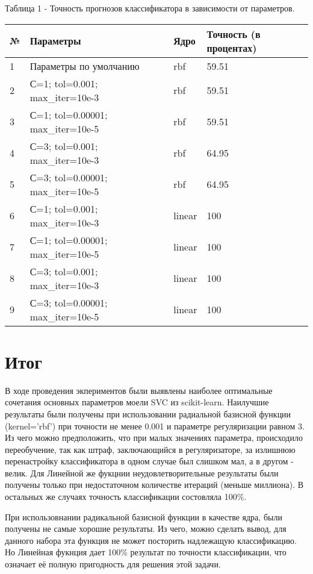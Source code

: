 \documentclass[a4paper,12pt]{article}
\begin{document}
	\vspace{0.5cm}
	Таблица 1 - Точность прогнозов классификатора в зависимости от параметров.
\begin{longtable}{|p{1cm}|p{8cm}|p{2cm}|p{2cm}|}
\hline 
№ & Параметры                         & Ядро    & Точность (в процентах) \\ 
\hline 
1 & Параметры по умолчанию            & rbf     & 59.51 \\
\hline
2 & С=1; tol=0.001; max\_iter=10e-3   & rbf     & 59.51 \\
\hline 
3 & С=1; tol=0.00001; max\_iter=10e-5 & rbf     & 59.51 \\
\hline 
4 &  С=3; tol=0.001; max\_iter=10e-3  & rbf     & 64.95 \\
\hline 
5 & С=3; tol=0.00001; max\_iter=10e-5 & rbf     & 64.95 \\
\hline
6 & С=1; tol=0.001; max\_iter=10e-3   & linear  & 100 \\
\hline 
7 & С=1; tol=0.00001; max\_iter=10e-5 & linear  & 100 \\
\hline 
8 &  С=3; tol=0.001; max\_iter=10e-3  & linear  & 100 \\
\hline 
9 & С=3; tol=0.00001; max\_iter=10e-5 & linear  & 100 \\
\hline
\end{longtable}


\newpage\section{Итог}
	В ходе проведения экпериментов были выявлены наиболее оптимальные сочетания основных параметров моели SVC из scikit-learn. Наилучшие результаты были получены при использовании радиальной базисной функции (kernel='rbf') при точности не менее 0.001 и параметре регуляризации равном 3. Из чего можно предположить, что при малых значениях параметра, происходило переобучение, так как штраф, заключающийся в регуляризаторе, за излишнюю перенастройку классификатора в одном случае был слишком мал, а в другом - велик.
	Для Линейной же фукцнии неудовлетворительные результаты были получены только при недостаточном количестве итераций (меньше миллиона). В остальных же случаях точность классификации состовляла 100\%.
	
	\vspace{0.5cm}
	При использовнании радикальной базисной функции в качестве ядра, были получены не самые хорошие результаты. Из чего, можно сделать вывод, для данного набора эта функция не может посторить надлежащую классификацию. \\
	Но Линейная фукнция дает 100\% результат по точности классификации, что означает её полную пригодность для решения этой задачи.
	
	
\end{document}
